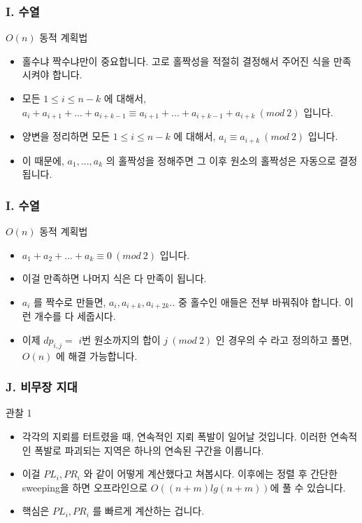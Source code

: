 \documentclass{beamer}
\begin{document}
\begin{frame}
	\frametitle{I. 수열}
	\begin{block}{$O(n)$ 동적 계획법}
		\begin{itemize}
			\item 홀수냐 짝수냐만이 중요합니다. 고로 홀짝성을 적절히 결정해서 주어진 식을 만족시켜야 합니다. 
			\item 모든 $1 \leq i \leq n-k$ 에 대해서, $a_i + a_{i+1} + ... + a_{i+k-1} \equiv a_{i+1} + ... + a_{i+k-1} + a_{i+k}\ (mod\ 2)$ 입니다. 
			\item 양변을 정리하면 모든 $1 \leq i \leq n-k$ 에 대해서, $a_i  \equiv a_{i+k}\ (mod\ 2)$ 입니다.
			\item 이 때문에, $a_1, ..., a_k$ 의 홀짝성을 정해주면 그 이후 원소의 홀짝성은 자동으로 결정됩니다. 
		\end{itemize}
	\end{block}
\end{frame}



\begin{frame}
	\frametitle{I. 수열}
	\begin{block}{$O(n)$ 동적 계획법}
		\begin{itemize}
			\item $a_1 + a_2 + ... + a_k \equiv 0\ (mod\ 2)$ 입니다.
			\item 이걸 만족하면 나머지 식은 다 만족이 됩니다.
			\item $a_i$ 를 짝수로 만들면, $a_i, a_{i+k}, a_{i+2k} .. $ 중 홀수인 애들은 전부 바꿔줘야 합니다. 이런 개수를 다 세줍시다.
			\item 이제 $dp_{i, j} =$ $i$번 원소까지의 합이 $j\ (mod\ 2)$ 인 경우의 수 라고 정의하고 풀면, $O(n)$ 에 해결 가능합니다. 
		\end{itemize}
	\end{block}
\end{frame}

\begin{frame}
	\frametitle{J. 비무장 지대}
	\begin{block}{관찰 1}
		\begin{itemize}
			\item 각각의 지뢰를 터트렸을 때, 연속적인 지뢰 폭발이 일어날 것입니다. 이러한 연속적인 폭발로 파괴되는 지역은 하나의 연속된 구간을 이룹니다.
			\item 이걸 $PL_i, PR_i$ 와 같이 어떻게 계산했다고 쳐봅시다. 이후에는 정렬 후 간단한 sweeping을 하면 오프라인으로 $O((n+m)lg(n+m))$에 풀 수 있습니다.
			\item 핵심은 $PL_i, PR_i$ 를 빠르게 계산하는 겁니다.
		\end{itemize}
	\end{block}
\end{frame}
\end{document}
